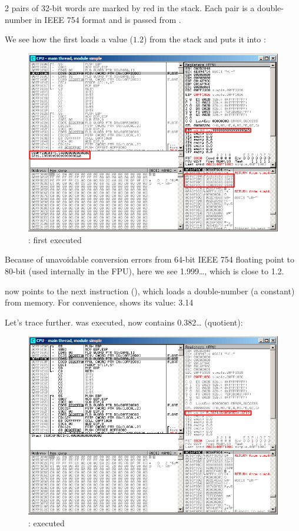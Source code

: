 ﻿\clearpage
{}
\myindex{\olly}

2 pairs of 32-bit words are marked by red in the stack. 
Each pair is a double-number in IEEE 754 format and is passed from \main.

We see how the first \FLD loads a value ($1.2$) from the stack and puts it into :

\begin{figure}[H]
\centering
\includegraphics[scale=\FigScale]{patterns/12_FPU/1_simple/olly1.png}
\caption{\olly: first \FLD executed}
\label{fig:FPU_simple_olly_1}
\end{figure}

Because of unavoidable conversion errors from 64-bit IEEE 754 floating point to 80-bit
(used internally in the FPU), here we see 1.999\ldots, which is close to 1.2.

\EIP now points to the next instruction (\FDIV), which loads a double-number (a constant) from memory.
For convenience, \olly shows its value: 3.14

\clearpage
Let's trace further. 
\FDIV was executed, now  contains 0.382\ldots
(\gls{quotient}):

\begin{figure}[H]
\centering
\includegraphics[scale=\FigScale]{patterns/12_FPU/1_simple/olly2.png}
\caption{\olly: \FDIV executed}
\label{fig:FPU_simple_olly_2}
\end{figure}

